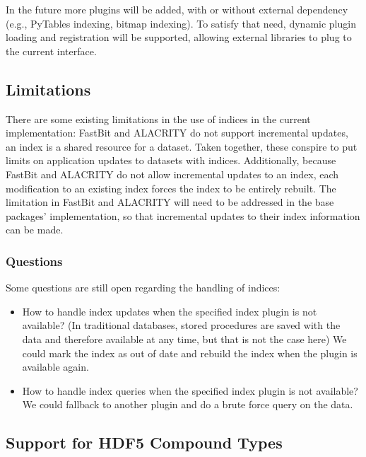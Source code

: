 \documentclass[letterpaper,hyper]{THG_RFC}
\begin{document}
In the future more plugins will be added, with or without external dependency
(e.g., PyTables indexing, bitmap indexing).
To satisfy that need, dynamic plugin loading and registration will be supported,
allowing external libraries to plug to the current interface.

\subsection{Limitations}

There are some existing limitations in the use of indices in the current
implementation: FastBit and ALACRITY do not support incremental updates,
an index is a shared resource for a dataset. Taken together, these conspire to
put limits on application updates to datasets with indices.
Additionally, because FastBit and ALACRITY do not allow incremental updates to
an index, each modification to an existing index forces the index to be entirely
rebuilt. The limitation in FastBit and ALACRITY will need to be addressed in
the base packages' implementation, so that incremental updates
to their index information can be made.

\subsubsection*{Questions}
Some questions are still open regarding the handling of indices:
\begin{itemize}
\item How to handle index updates when the specified index plugin is not available?
(In traditional databases, stored procedures are saved with the data and
therefore available at any time, but that is not the case here)
We could mark the index as out of date and rebuild the index when the plugin is
available again.
\item How to handle index queries when the specified index plugin is not
available? We could fallback to another plugin and do a brute force query on the data.
\end{itemize}

\subsection{Support for HDF5 Compound Types}
\end{document}
